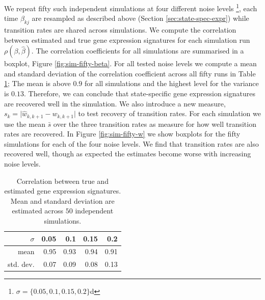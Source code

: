 We repeat fifty such independent simulations at four different noise levels \footnote{$\sigma=\lbrace 0.05, 0.1, 0.15, 0.2 \rbrace$d}, each time $\beta_{kj}$ are resampled as described above (Section \ref{sec:state-spec-expr}) while transition rates are shared across simulations. We compute the correlation between estimated and true gene expression signatures for each simulation run $\rho(\beta,\hat{\beta})$. The correlation coefficients for all simulations are summarised in a boxplot, Figure \ref{fig:sim-fifty-beta}. For all tested noise levels we compute a mean and standard deviation of the correlation coefficient across all fifty runs in Table \ref{tab:cor-beta-fifty}; The mean is above $0.9$ for all simulations and the highest level for the variance is $0.13$. Therefore, we can conclude that state-specific gene expression signatures are recovered well in the simulation. We also introduce a new measure, $s_k = \lvert \hat{w}_{k,k+1} - w_{k,k+1} \rvert$ to test recovery of transition rates. For each simulation we use the mean $\bar{s}$ over the three transition rates as measure for how well transition rates are recovered. In Figure \ref{fig:sim-fifty-w} we show boxplots for the fifty simulations for each of the four noise levels. We find that transition rates are also recovered well, though as expected the estimates become worse with increasing noise levels.

\begin{table}[ht]
\centering
\begin{tabular}{rrrrr}
  \hline
$\sigma$ & 0.05 & 0.1 & 0.15 & 0.2 \\
  \hline
mean & 0.95 & 0.93 & 0.94 & 0.91 \\
std. dev. & 0.07 & 0.09 & 0.08 & 0.13 \\
   \hline
 \end{tabular}
 \caption{Correlation between true and estimated gene expression signatures. Mean and standard deviation are estimated across $50$ independent simulations.}
 \label{tab:cor-beta-fifty}
\end{table}

